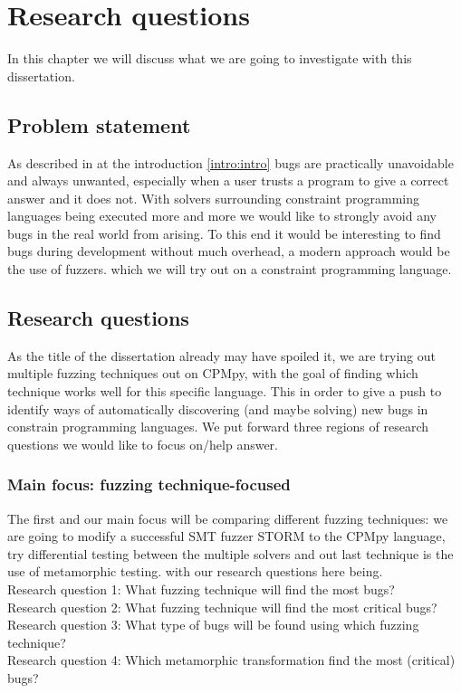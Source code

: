 \chapter{Research questions}
\label{cha:RQ}
\label{RQ:intro}
In this chapter we will discuss what we are going to investigate with this dissertation.

\section{Problem statement}\label{RQ:ProblemStatment}
As described in at the introduction \ref{intro:intro} bugs are practically unavoidable and always unwanted, especially when a user trusts a program to give a correct answer and it does not. With solvers surrounding constraint programming languages being executed more and more we would like to strongly avoid any bugs in the real world from arising. To this end it would be interesting to find bugs during development without much overhead, a modern approach would be the use of fuzzers. which we will try out on a constraint programming language.

\section{Research questions}\label{RQ:RQ's}
As the title of the dissertation already may have spoiled it, we are trying out multiple fuzzing techniques out on CPMpy, with the goal of finding which technique works well for this specific language. This in order to give a push to identify ways of automatically discovering (and maybe solving) new bugs in constrain programming languages. We put forward three regions of research questions we would like to focus on/help answer.

\subsection{Main focus: fuzzing technique-focused}
The first and our main focus will be comparing different fuzzing techniques: we are going to modify a successful SMT fuzzer STORM to the CPMpy language, try differential testing between the multiple solvers and out last technique is the use of metamorphic testing. with our research questions here being.
\\
Research question 1: What fuzzing technique will find the most bugs?\\
Research question 2: What fuzzing technique will find the most critical bugs?\\
Research question 3: What type of bugs will be found using which fuzzing technique?\\
Research question 4: Which metamorphic transformation find the most (critical) bugs?\\
